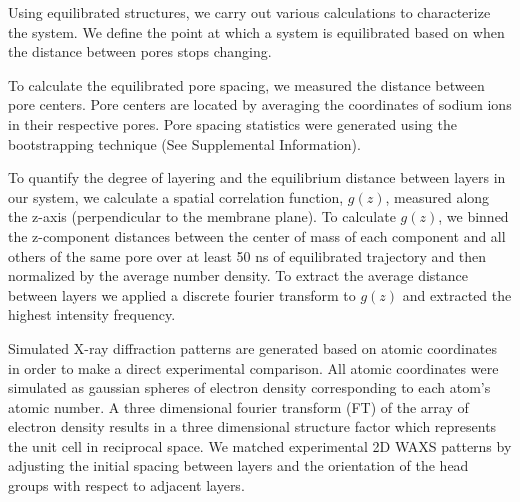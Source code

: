 \documentclass{article}
\begin{document}
  Using equilibrated structures, we carry out various calculations to
  characterize the system. We define the point at which a system is
  equilibrated based on when the distance between pores stops changing.

  To calculate the equilibrated pore spacing, we measured the distance between
  pore centers. Pore centers are located by averaging the coordinates of sodium
  ions in their respective pores. Pore spacing statistics were generated 
  using the bootstrapping technique (See Supplemental Information).

  To quantify the degree of layering and the equilibrium distance between layers
  in our system, we calculate a spatial correlation function, $g(z)$, measured
  along the z-axis (perpendicular to the membrane plane). To calculate $g(z)$,
  we binned the z-component distances between the center of mass of each
  component and all others of the same pore over at least 50 ns of equilibrated
  trajectory and then normalized by the average number density. To extract the
  average distance between layers we applied a discrete fourier transform to
  $g(z)$ and extracted the highest intensity frequency.

  Simulated X-ray diffraction patterns are generated based on atomic
  coordinates in order to make a direct experimental comparison. All atomic
  coordinates were simulated as gaussian spheres of electron density
  corresponding to each atom's atomic number. A three dimensional fourier
  transform (FT) of the array of electron density results in a three dimensional
  structure factor which represents the unit cell in reciprocal space. We matched
  experimental 2D WAXS patterns by adjusting the initial spacing between layers
  and the orientation of the head groups with respect to adjacent layers.
\end{document}
